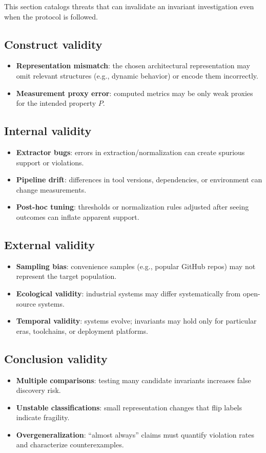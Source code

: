 This section catalogs threats that can invalidate an invariant investigation even when the protocol is followed.

\subsection*{Construct validity}
\begin{itemize}[leftmargin=*]
  \item \textbf{Representation mismatch}: the chosen architectural representation may omit relevant structures (e.g., dynamic behavior) or encode them incorrectly.
  \item \textbf{Measurement proxy error}: computed metrics may be only weak proxies for the intended property $P$.
\end{itemize}

\subsection*{Internal validity}
\begin{itemize}[leftmargin=*]
  \item \textbf{Extractor bugs}: errors in extraction/normalization can create spurious support or violations.
  \item \textbf{Pipeline drift}: differences in tool versions, dependencies, or environment can change measurements.
  \item \textbf{Post-hoc tuning}: thresholds or normalization rules adjusted after seeing outcomes can inflate apparent support.
\end{itemize}

\subsection*{External validity}
\begin{itemize}[leftmargin=*]
  \item \textbf{Sampling bias}: convenience samples (e.g., popular GitHub repos) may not represent the target population.
  \item \textbf{Ecological validity}: industrial systems may differ systematically from open-source systems.
  \item \textbf{Temporal validity}: systems evolve; invariants may hold only for particular eras, toolchains, or deployment platforms.
\end{itemize}

\subsection*{Conclusion validity}
\begin{itemize}[leftmargin=*]
  \item \textbf{Multiple comparisons}: testing many candidate invariants increases false discovery risk.
  \item \textbf{Unstable classifications}: small representation changes that flip labels indicate fragility.
  \item \textbf{Overgeneralization}: ``almost always'' claims must quantify violation rates and characterize counterexamples.
\end{itemize}

